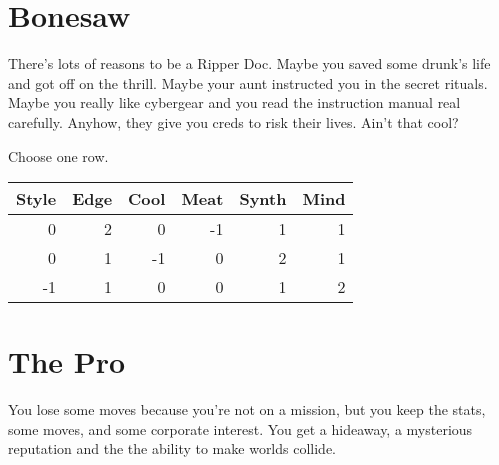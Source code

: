 \documentclass{tufte-book}
\begin{document}



\section{Bonesaw} \label{sec:Bonesaw}

There's lots of reasons to be a Ripper Doc. Maybe you saved some drunk's life and got off on the thrill. Maybe your aunt instructed you in the secret rituals. Maybe you really like cybergear and you read the instruction manual real carefully. Anyhow, they give you creds to risk their lives. Ain't that cool?


Choose one row.
\begin{table}[ht]
\centering
{}\selectfont
\begin{tabular}{rrrrrr}
\toprule
Style & Edge & Cool & Meat & Synth & Mind\\
\midrule
0&2&0&-1&1&1\\
0&1&-1&0&2&1\\
-1&1&0&0&1&2\\
\bottomrule
\end{tabular}
\end{table}



\section{The Pro} \label{sec:The Pro}
You lose some moves because you're not on a mission, but you keep the stats, some moves, and some corporate interest. You get a hideaway, a mysterious reputation and the the ability to make worlds collide.
\end{document}
